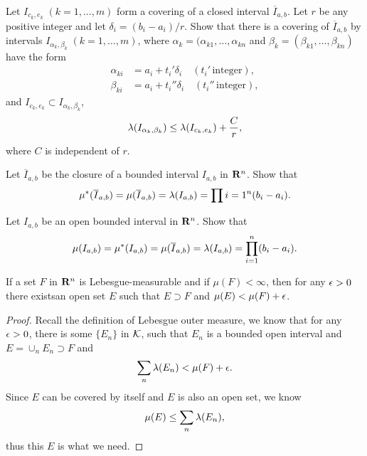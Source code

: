 \begin{pro}%
	Let $I_{c_k,e_k}\;(k=1,\ldots,m)$ form a covering of a closed interval $\overline{I}_{a,b}$. Let $r$ be any positive integer and let $\delta_i=(b_i-a_i)/r$. Show that there is a covering of $\overline{I}_{a,b}$ by intervals $I_{\alpha_k,\beta_k}\;(k=1,\ldots,m)$, where $\alpha_k=(\alpha_{k1},\ldots,\alpha_{kn}$ and $\beta_k=(\beta_{k1},\ldots,\beta_{kn})$ have the form
	\begin{align*}
		\alpha_{ki}&=a_i+t_i'\delta_i\quad(t_i'\,\mbox{integer}),\\
		\beta_{ki}&=a_i+t_i''\delta_i\quad(t_i''\,\mbox{integer}),
	\end{align*}
	and $I_{c_k,e_k}\subset I_{\alpha_k,\beta_k}$,
	\[\lambda(I_{\alpha_k,\beta_k})\leq\lambda(I_{c_k,e_k})+\frac{C}{r},\]
	where $C$ is independent of $r$.
\end{pro}
	
\begin{pro}%
	Let $\overline{I}_{a,b}$ be the closure of a bounded interval $I_{a,b}$ in $\mathbf{R}^n$. Show that 
	\[\mu^*(\overline{I}_{a,b})=\mu(\overline{I}_{a,b})=\lambda(I_{a,b})=\prod{i=1}^n (b_i-a_i).\]
\end{pro}

\begin{pro}%
	Let $I_{a,b}$ be an open bounded interval in $\mathbf{R}^n$. Show that
	\[\mu(I_{a,b})=\mu^*(I_{a,b})=\mu(\overline{I}_{a,b})=\lambda(I_{a,b})=\prod_{i=1}^n (b_i-a_i).\]
\end{pro}	

\begin{pro}%
	If a set $F$ in $\mathbf{R}^n$ is Lebesgue-measurable and if $\mu(F)<\infty$, then for any $\epsilon>0$ there existsan open set $E$ such that $E\supset F$ and $\mu(E)<\mu(F)+\epsilon$.
\end{pro}
\begin{proof}
	Recall the definition of Lebesgue outer measure, we know that for any $\epsilon>0$, there is some $\{E_n\}$ in $\mathcal{K}$, such that $E_n$ is a bounded open interval and $E=\cup_n E_n\supset F$ and
	\[\sum_{n} \lambda(E_n)<\mu(F)+\epsilon.\]
	Since $E$ can be covered by itself and $E$ is also an open set, we know
	\[\mu(E)\leq \sum_{n}\lambda(E_n),\]
	thus this $E$ is what we need.
\end{proof}

